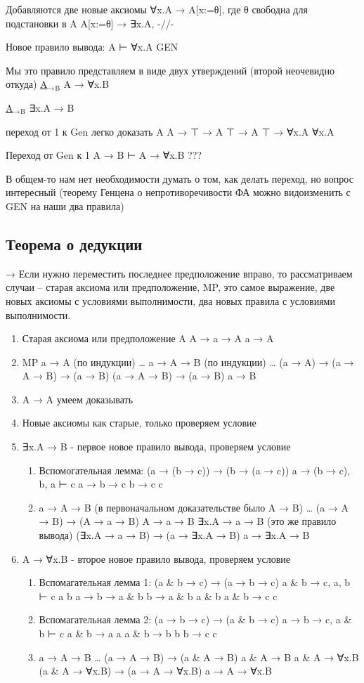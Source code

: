 \documentclass[11pt]{article}
\begin{document}
Добавляются две новые аксиомы
∀x.A → A[x:=θ], где θ свободна для подстановки в A
A[x:=θ] → ∃x.A, -//-

Новое правило вывода:
A ⊢ ∀x.A    GEN

Мы это правило представляем в виде двух утверждений (второй неочевидно откуда)
\uline{A$_{\text{→}}$$_{\text{B}}$}
A → ∀x.B

\uline{A$_{\text{→}}$$_{\text{B}}$}
∃x.A → B

переход от 1 к Gen легко доказать
A
A → ⊤ → A
⊤ → A
⊤ → ∀x.A
∀x.A

Переход от Gen к 1
A → B ⊢ A → ∀x.B
???

В общем-то нам нет необходимости думать о том, как делать переход,
но вопрос интересный (теорему Генцена о непротиворечивости ФА
можно видоизменить с GEN на наши два правила)
\subsection{Теорема о дедукции}
\label{sec-7-2}
→ Если нужно переместить последнее предположение вправо,
то рассматриваем случаи -- старая аксиома или предположение,
MP, это самое выражение, две новых аксиомы с условиями выполнимости,
два новых правила с условиями выполнимости.
\begin{enumerate}
\item Старая аксиома или предположение
A
A → a → A
a → A
\item MP
a → A (по индукции)
\ldots{}
a → A → B (по индукции)
\ldots{}
(a → A) → (a → A → B) → (a → B)
(a → A → B) → (a → B)
a → B
\item A → A умеем доказывать
\item Новые аксиомы как старые, только проверяем условие
\item ∃x.A → B - первое новое правило вывода, проверяем условие
\begin{enumerate}
\item Вспомогательная лемма: (a → (b → c)) → (b → (a → c))
a → (b → c), b, a ⊢ c
a → b → c
b → c
c
\item a → A → B (в первоначальном доказательстве было A → B)
\ldots{}
(a → A → B) → (A → a → B)
A → a → B
∃x.A → a → B (это же правило вывода)
(∃x.A → a → B) → (a → ∃x.A → B)
a → ∃x.A → B
\end{enumerate}
\item A → ∀x.B - второе новое правило вывода, проверяем условие
\begin{enumerate}
\item Вспомагательная лемма 1: (a \& b → c) → (a → b → c)
a \& b → c, a, b ⊢ c
a
b
a → b → a \& b
b → a \& b
a \& b
a \& b → c
c
\item Вспомагательная лемма 2: (a → b → c) → (a \& b → c)
a → b → c, a \& b ⊢ c
a \& b → a
a
a \& b → b
b
b → c
c
\item a → A → B
\ldots{}
(a → A → B) → (a \& A → B)
a \& A → B
a \& A → ∀x.B
(a \& A → ∀x.B) → (a → A → ∀x.B)
a → A → ∀x.B
\end{enumerate}
\end{enumerate}
\end{document}

